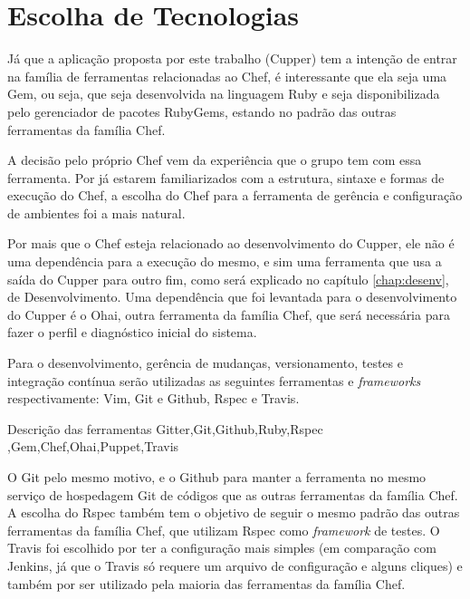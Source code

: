 \section{Escolha de Tecnologias}
\label{sec:tec}

Já que a aplicação proposta por este trabalho (Cupper) tem a intenção de entrar
na família de ferramentas relacionadas ao Chef, é interessante que ela seja uma
Gem, ou seja, que seja desenvolvida na linguagem Ruby e seja disponibilizada pelo
gerenciador de pacotes RubyGems, estando no padrão das outras ferramentas da
família Chef.

A decisão pelo próprio Chef vem da experiência que o grupo tem com essa ferramenta.
Por já estarem familiarizados com a estrutura, sintaxe e formas de execução do Chef,
a escolha do Chef para a ferramenta de gerência e configuração de ambientes foi a
mais natural.

Por mais que o Chef esteja relacionado ao desenvolvimento do Cupper, ele não é uma
dependência para a execução do mesmo, e sim uma ferramenta que usa a saída do Cupper
para outro fim, como será explicado no capítulo \ref{chap:desenv}, de Desenvolvimento.
Uma dependência que foi levantada para o desenvolvimento do Cupper é o Ohai,
outra ferramenta da família Chef, que será necessária para fazer o perfil e diagnóstico
inicial do sistema.

Para o desenvolvimento, gerência de mudanças, versionamento, testes e integração
contínua serão utilizadas as seguintes ferramentas e \textit{frameworks} respectivamente:
Vim, Git e Github, Rspec e Travis.

{\color{red} Descrição das ferramentas Gitter,Git,Github,Ruby,Rspec
,Gem,Chef,Ohai,Puppet,Travis}

O Git pelo mesmo motivo, e o Github para manter a ferramenta no mesmo serviço de hospedagem
Git de códigos que as outras ferramentas da família Chef. A escolha do Rspec também
tem o objetivo de seguir o mesmo padrão das outras ferramentas da família Chef, que
utilizam Rspec como \textit{framework} de testes. O Travis foi escolhido por ter a
configuração mais simples (em comparação com Jenkins, já que o Travis só requere
um arquivo de configuração e alguns cliques) e também por ser utilizado pela
maioria das ferramentas da família Chef.
